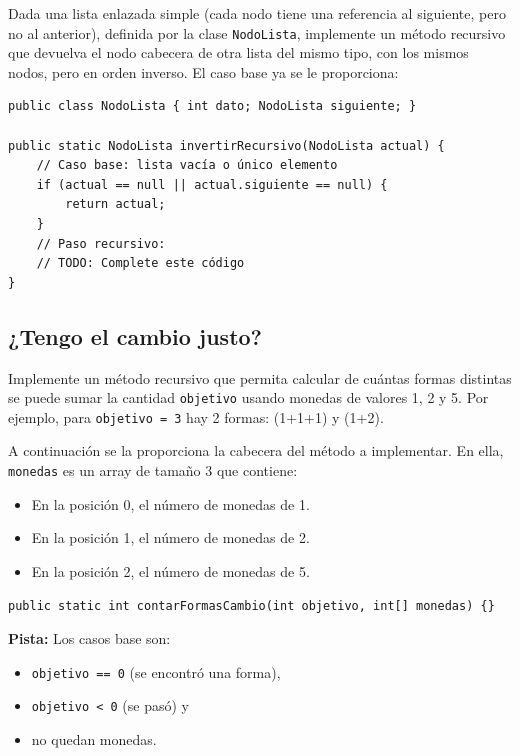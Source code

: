 \documentclass[a4paper]{article}
\newcommand{\code}[1]{\texttt{#1}}
\begin{document}
Dada una lista enlazada simple (cada nodo tiene una referencia al siguiente, pero no al anterior), definida por la clase \code{NodoLista}, implemente un método recursivo que devuelva el nodo cabecera de otra lista del mismo tipo, con los mismos nodos, pero en orden inverso. El caso base ya se le proporciona:

\begin{verbatim}
public class NodoLista { int dato; NodoLista siguiente; }

public static NodoLista invertirRecursivo(NodoLista actual) {
    // Caso base: lista vacía o único elemento
    if (actual == null || actual.siguiente == null) {
        return actual;
    }
    // Paso recursivo:
    // TODO: Complete este código
}
\end{verbatim}

\subsection{¿Tengo el cambio justo?}

Implemente un método recursivo que permita calcular de cuántas formas distintas se puede sumar la cantidad \code{objetivo} usando monedas de valores 1, 2 y 5. Por ejemplo, para \code{objetivo = 3} hay 2 formas: (1+1+1) y (1+2).

A continuación se la proporciona la cabecera del método a implementar. En ella, \code{monedas} es un array de tamaño 3 que contiene:
\begin{itemize}
    \item En la posición 0, el número de monedas de 1.
    \item En la posición 1, el número de monedas de 2.
    \item En la posición 2, el número de monedas de 5.
\end{itemize}

\begin{verbatim}
public static int contarFormasCambio(int objetivo, int[] monedas) {}
\end{verbatim}

\textbf{Pista:} Los casos base son:
\begin{itemize}
    \item \code{objetivo == 0} (se encontró una forma),
    \item \code{objetivo < 0} (se pasó) y
    \item no quedan monedas.
\end{itemize}
\end{document}
